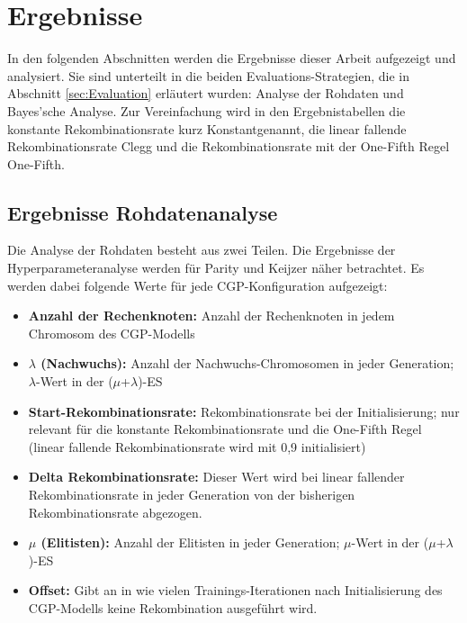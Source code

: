 \chapter{Ergebnisse}
\label{Ergebnisse}

In den folgenden Abschnitten werden die Ergebnisse dieser Arbeit aufgezeigt und analysiert.
Sie sind unterteilt in die beiden Evaluations-Strategien, die in Abschnitt \ref{sec:Evaluation} erläutert wurden: Analyse der Rohdaten und Bayes'sche Analyse.
Zur Vereinfachung wird in den Ergebnistabellen die konstante Rekombinationsrate kurz \glqq Konstant\grqq\space genannt, die linear fallende Rekombinationsrate \glqq Clegg \grqq\space und die Rekombinationsrate mit der One-Fifth Regel \glqq One-Fifth\grqq.

\section{Ergebnisse Rohdatenanalyse}
\label{sec:ergebnisseRohdaten}

Die Analyse der Rohdaten besteht aus zwei Teilen.
Die Ergebnisse der Hyperparameteranalyse werden für Parity und Keijzer näher betrachtet.
Es werden dabei folgende Werte für jede CGP-Konfiguration aufgezeigt:
\begin{itemize}
	\item \textbf{Anzahl der Rechenknoten:} Anzahl der Rechenknoten in jedem Chromosom des CGP-Modells
	\item \textbf{$\lambda$ (Nachwuchs):} Anzahl der Nachwuchs-Chromosomen in jeder Generation; $\lambda$-Wert in der ($\mu$+$\lambda$)-ES
	\item \textbf{Start-Rekombinationsrate:} Rekombinationsrate bei der Initialisierung; nur relevant für die konstante Rekombinationsrate und die One-Fifth Regel (linear fallende Rekombinationsrate wird mit 0,9 initialisiert)
	\item \textbf{Delta Rekombinationsrate:} Dieser Wert wird bei linear fallender Rekombinationsrate in jeder Generation von der bisherigen Rekombinationsrate abgezogen.
	\item \textbf{$\mu$ (Elitisten):} Anzahl der Elitisten in jeder Generation; $\mu$-Wert in der ($\mu$+$\lambda$)-ES
	\item \textbf{Offset:} Gibt an in wie vielen Trainings-Iterationen nach Initialisierung des CGP-Modells keine Rekombination ausgeführt wird.
\end{itemize}

